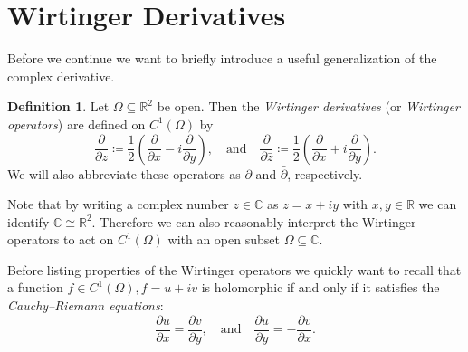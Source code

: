 \documentclass[letterpaper, 11pt]{article}
\newcommand{\R}{\mathbb{R}}
\newcommand{\C}{\mathbb{C}}
\newcommand{\1}{\mathds{1}}
\theoremstyle{definition}
\newtheorem{definition}[theorem]{Definition}
\begin{document}
\section{Wirtinger Derivatives}

Before we continue we want to briefly introduce a useful generalization of the complex derivative.

\begin{definition}
  Let $\Omega \subseteq \R^2$ be open. Then the \emph{Wirtinger derivatives} (or \emph{Wirtinger operators}) are defined on $C^1(\Omega)$ by
  \begin{equation*}
    \frac{\partial}{\partial z} \coloneqq \frac{1}{2} \left( \frac{\partial}{\partial x} - i \frac{\partial}{\partial y} \right), \quad \textrm{and} \quad
    \frac{\partial}{\partial \bar{z}} \coloneqq \frac{1}{2} \left( \frac{\partial}{\partial x} + i \frac{\partial}{\partial y} \right).
  \end{equation*}
  We will also abbreviate these operators as $\partial$ and $\bar{\partial}$, respectively.
\end{definition}

Note that by writing a complex number $z \in \C$ as $z = x + iy$ with $x, y \in \R$ we can identify $\C \cong \R^2$. Therefore we can also reasonably interpret the Wirtinger operators to act on $C^1(\Omega)$ with an open subset $\Omega \subseteq \C$.

Before listing properties of the Wirtinger operators we quickly want to recall that a function $f \in C^1(\Omega), f = u + iv$ is holomorphic if and only if it satisfies the \emph{Cauchy--Riemann equations}:
\begin{equation*}
  \frac{\partial u}{\partial x} = \frac{\partial v}{\partial y}, \quad \textrm{and} \quad \frac{\partial u}{\partial y} = -\frac{\partial v}{\partial x}.
\end{equation*}
\end{document}
